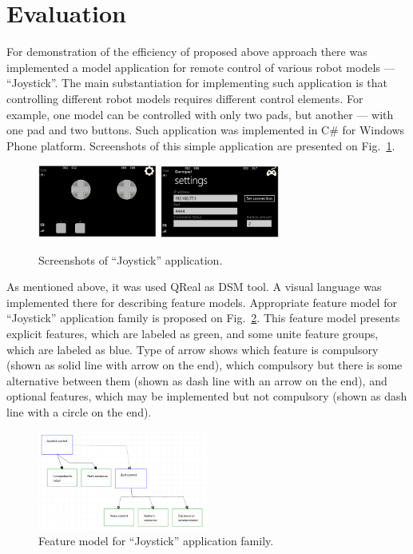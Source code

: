 \documentclass[conference]{IEEEtran}
\begin{document}
\section{Evaluation}
\label{chapter:evaluation}
For demonstration of the efficiency of proposed above approach there was implemented a model application for remote control of various robot models --- ``Joystick''. The main substantiation for implementing such application is that controlling different robot models requires different control elements. For example, one model can be controlled with only two pads, but another --- with one pad and two buttons. Such application was implemented in C\# for Windows Phone platform. Screenshots of this simple application are presented on Fig.~\ref{image:joystick}. 

\begin{figure}[t]
	\centering
	\includegraphics[width=0.35\textwidth]{joystick1.png}
	\includegraphics[width=0.35\textwidth]{joystick2.png}
	\caption{Screenshots of ``Joystick'' application.}
	\label{image:joystick}
\end{figure}


As mentioned above, it was used QReal as DSM tool. A visual language was implemented there for describing feature models. Appropriate feature model for ``Joystick'' application family is proposed on Fig.~\ref{image:joystickFeatureModel}. This feature model presents explicit features, which are labeled as green, and some unite feature groups, which are labeled as blue. Type of arrow shows which feature is compulsory (shown as solid line with arrow on the end), which compulsory but there is some alternative between them (shown as dash line with an arrow on the end), and optional features, which may be implemented but not compulsory (shown as dash line with a circle on the end).

\begin{figure}[H]
	\centering
	\includegraphics[width=0.5\textwidth]{joystickFeatureModel.png}
	\caption{Feature model for ``Joystick'' application family.}
	\label{image:joystickFeatureModel}
\end{figure}
\end{document}
